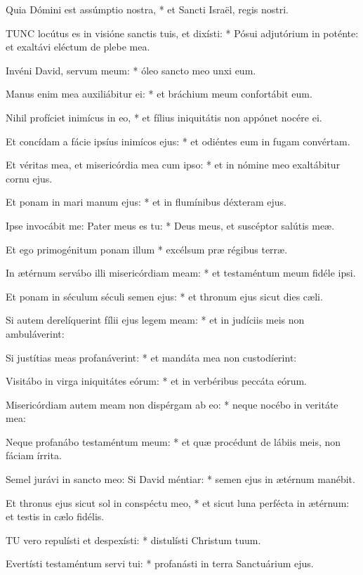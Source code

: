 Quia Dómini est assúmptio nostra, * et Sancti Israël, regis nostri.


\lettrine[lines=2]{T}{UNC} locútus es in visióne sanctis tuis, et dixísti: * Pósui adjutórium in poténte: et exaltávi eléctum de plebe mea.

Invéni David, servum meum: * óleo sancto meo unxi eum.

Manus enim mea auxiliábitur ei: * et bráchium meum confortábit eum.

Nihil profíciet inimícus in eo, * et fílius iniquitátis non appónet nocére ei.

Et concídam a fácie ipsíus inimícos ejus: * et odiéntes eum in fugam convértam.

Et véritas mea, et misericórdia mea cum ipso: * et in nómine meo exaltábitur cornu ejus.

Et ponam in mari manum ejus: * et in flumínibus déxteram ejus.

Ipse invocábit me: Pater meus es tu: * Deus meus, et suscéptor salútis meæ.

Et ego primogénitum ponam illum * excélsum præ régibus terræ.

In ætérnum servábo illi misericórdiam meam: * et testaméntum meum fidéle ipsi.

Et ponam in séculum séculi semen ejus: * et thronum ejus sicut dies cæli.

Si autem derelíquerint fílii ejus legem meam: * et in judíciis meis non ambuláverint:

Si justítias meas profanáverint: * et mandáta mea non custodíerint:

Visitábo in virga iniquitátes eórum: * et in verbéribus peccáta eórum.

Misericórdiam autem meam non dispérgam ab eo: * neque nocébo in veritáte mea:

Neque profanábo testaméntum meum: * et quæ procédunt de lábiis meis, non fáciam írrita.

Semel jurávi in sancto meo: Si David méntiar: * semen ejus in ætérnum manébit.

Et thronus ejus sicut sol in conspéctu meo, * et sicut luna perfécta in ætérnum: et testis in cælo fidélis.


\lettrine[lines=2]{T}{U} vero repulísti et despexísti: * distulísti Christum tuum.

Evertísti testaméntum servi tui: * profanásti in terra Sanctuárium ejus.

